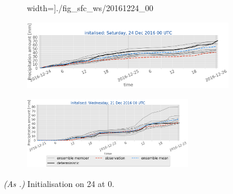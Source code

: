 \begin{figure}[H]
\begin{subfigure}[b]{0.9\textwidth}
   		width=\textwidth]{./fig_sfc_ws/20161224_00}
   		\caption{}\label{fig:res:sfc_ws24}
   	\end{subfigure}
   	\begin{subfigure}[b]{0.9\textwidth}
   		\includegraphics[trim={0.cm 1.5cm 0cm 0cm},clip,
   		width=\textwidth]{./fig_sfc_precip/20161224_00}
   		\caption{}\label{fig:res:sfc_precip24}
   	\end{subfigure}
   	\begin{subfigure}[b]{\textwidth}
   		\centering
   		\includegraphics[trim={5.5cm 0cm 5.cm 17.7cm},clip,
   		width=0.8\textwidth]{./fig_sfc_precip/20161221_00_label}
   	\end{subfigure}
   	\caption{\textit{(As .)} Initialisation on \SI{24}{\dec} at \SI{0}{\UTC}. }\label{fig:obs_meps:24}
   \end{figure}
